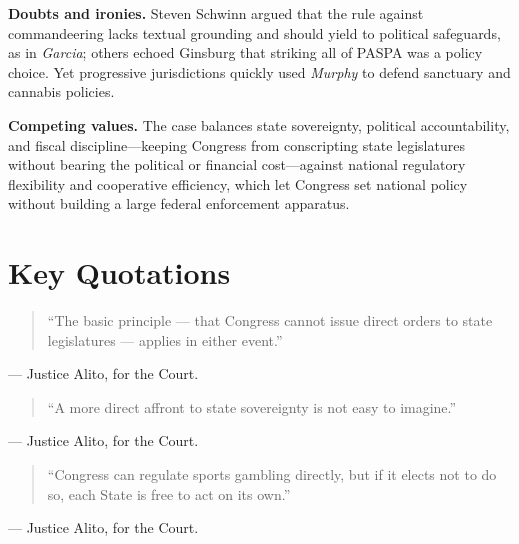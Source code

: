 \documentclass[12pt]{article}
\begin{document}
\textbf{Doubts and ironies.} Steven Schwinn argued that the rule against commandeering lacks textual grounding and should yield to political safeguards, as in \textit{Garcia}; others echoed Ginsburg that striking all of PASPA was a policy choice. Yet progressive jurisdictions quickly used \textit{Murphy} to defend sanctuary and cannabis policies.

\textbf{Competing values.} The case balances state sovereignty, political accountability, and fiscal discipline---keeping Congress from conscripting state legislatures without bearing the political or financial cost---against national regulatory flexibility and cooperative efficiency, which let Congress set national policy without building a large federal enforcement apparatus.

\section{Key Quotations}

\begin{quote}
``The basic principle --- that Congress cannot issue direct orders to state legislatures --- applies in either event.''
\end{quote}
\noindent --- Justice Alito, for the Court.

\begin{quote}
``A more direct affront to state sovereignty is not easy to imagine.''
\end{quote}
\noindent --- Justice Alito, for the Court.

\begin{quote}
``Congress can regulate sports gambling directly, but if it elects not to do so, each State is free to act on its own.''
\end{quote}
\noindent --- Justice Alito, for the Court.
\end{document}
